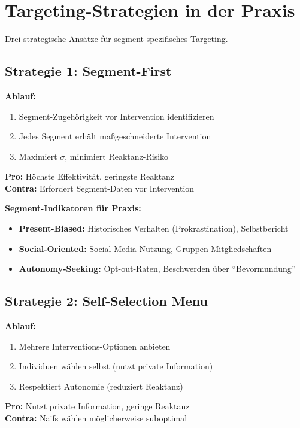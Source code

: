 \section{Targeting-Strategien in der Praxis}
\label{sec:19-targeting}

Drei strategische Ansätze für segment-spezifisches Targeting.

\subsection{Strategie 1: Segment-First}

\begin{tcolorbox}[colback=blue!5!white, colframe=blue!75!black,
    title=Strategie: Segment-First Targeting]
\textbf{Ablauf:}
\begin{enumerate}[nosep]
\item Segment-Zugehörigkeit vor Intervention identifizieren
\item Jedes Segment erhält maßgeschneiderte Intervention
\item Maximiert $\sigma$, minimiert Reaktanz-Risiko
\end{enumerate}

\textbf{Pro:} Höchste Effektivität, geringste Reaktanz\\
\textbf{Contra:} Erfordert Segment-Daten vor Intervention
\end{tcolorbox}

\textbf{Segment-Indikatoren für Praxis:}
\begin{itemize}
\item \textbf{Present-Biased:} Historisches Verhalten (Prokrastination), Selbstbericht
\item \textbf{Social-Oriented:} Social Media Nutzung, Gruppen-Mitgliedschaften
\item \textbf{Autonomy-Seeking:} Opt-out-Raten, Beschwerden über ``Bevormundung''
\end{itemize}

\subsection{Strategie 2: Self-Selection Menu}

\begin{tcolorbox}[colback=blue!5!white, colframe=blue!75!black,
    title=Strategie: Self-Selection Menu]
\textbf{Ablauf:}
\begin{enumerate}[nosep]
\item Mehrere Interventions-Optionen anbieten
\item Individuen wählen selbst (nutzt private Information)
\item Respektiert Autonomie (reduziert Reaktanz)
\end{enumerate}

\textbf{Pro:} Nutzt private Information, geringe Reaktanz\\
\textbf{Contra:} Naifs wählen möglicherweise suboptimal
\end{tcolorbox}

